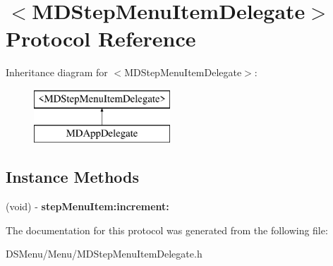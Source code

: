 \hypertarget{protocol_m_d_step_menu_item_delegate-p}{\section{$<$M\-D\-Step\-Menu\-Item\-Delegate$>$ Protocol Reference}
\label{protocol_m_d_step_menu_item_delegate-p}
}
Inheritance diagram for $<$M\-D\-Step\-Menu\-Item\-Delegate$>$\-:\begin{figure}[H]
\begin{center}
\leavevmode
\includegraphics[height=2.000000cm]{protocol_m_d_step_menu_item_delegate-p}
\end{center}
\end{figure}
\subsection*{Instance Methods}
\begin{DoxyCompactItemize}
\item 
\hypertarget{protocol_m_d_step_menu_item_delegate-p_a5f6aa6465eddda9ad44d1ec310289835}{(void) -\/ {\bfseries step\-Menu\-Item\-:increment\-:}}\label{protocol_m_d_step_menu_item_delegate-p_a5f6aa6465eddda9ad44d1ec310289835}

\end{DoxyCompactItemize}


The documentation for this protocol was generated from the following file\-:\begin{DoxyCompactItemize}
\item 
D\-S\-Menu/\-Menu/M\-D\-Step\-Menu\-Item\-Delegate.\-h\end{DoxyCompactItemize}
